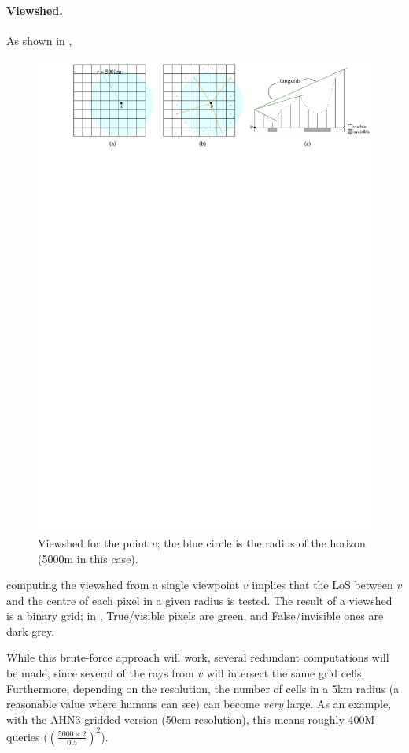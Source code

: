 \paragraph{Viewshed.}
As shown in ,
\begin{figure}
  \centering
  \includegraphics[width=\linewidth]{figs/viewshed}
  \caption{Viewshed for the point $v$; the blue circle is the radius of the horizon (5000m in this case).}%
\end{figure}
computing the viewshed from a single viewpoint $v$ implies that the LoS between $v$ and the centre of each pixel in a given radius is tested. 
The result of a viewshed is a binary grid; in , True/visible pixels are green, and False/invisible ones are dark grey.

%

While this brute-force approach will work, several redundant computations will be made, since several of the rays from $v$ will intersect the same grid cells.
Furthermore, depending on the resolution, the number of cells in a 5km radius (a reasonable value where humans can see) can become \emph{very} large.
As an example, with the AHN3 gridded version (50cm resolution), this means roughly 400M queries ($(\frac{5000 \times 2}{0.5})^2$).

